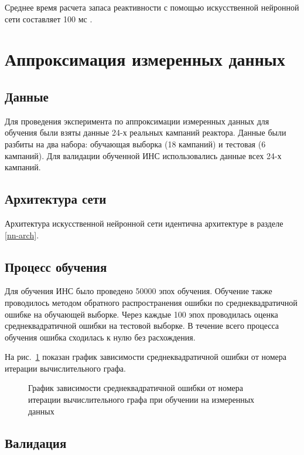 Среднее время расчета запаса реактивности с помощью искусственной
нейронной сети составляет 100 мс \cite{iop-2018}.

\section{Аппроксимация измеренных данных}

\subsection{Данные}

Для проведения эксперимента по аппроксимации измеренных данных для обучения были взяты данные 24-х реальных кампаний реактора.
Данные были разбиты на два набора: обучающая выборка (18 кампаний) и тестовая (6 кампаний).
Для валидации обученной ИНС использовались данные всех 24-х кампаний.

\subsection{Архитектура сети}

Архитектура искусственной нейронной сети идентична архитектуре в разделе \ref{nn-arch}.

\subsection{Процесс обучения}

Для обучения ИНС было проведено 50000 эпох обучения.
Обучение также проводилось методом обратного распространения ошибки по среднеквадратичной ошибке на обучающей выборке.
Через каждые 100 эпох проводилась оценка среднеквадратичной ошибки на тестовой выборке. В течение всего процесса обучения ошибка сходилась к нулю без расхождения.

На рис.~\ref{pic:real-data-loss} показан график зависимости среднеквадратичной ошибки от номера итерации вычислительного графа.

\begin{figure}[p]
    \caption[График среднеквадратичной ошибки ИНС на измеренных данных]{График зависимости среднеквадратичной ошибки от номера итерации вычислительного графа при обучении на измеренных данных}
    \label{pic:real-data-loss}
\end{figure}


\subsection{Валидация}

